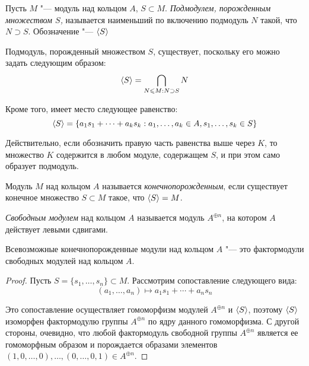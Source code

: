 \begin{definition}
	Пусть $M$ "--- модуль над кольцом $A$, $S \subset M$. \textit{Подмодулем, порожденным множеством $S$,} называется наименьший по включению подмодуль $N$ такой, что $N \supset S$. Обозначение "--- $\langle S \rangle$
\end{definition}

\begin{note}
	Подмодуль, порожденный множеством $S$, существует, поскольку его можно задать следующим образом:
	\[\langle S \rangle = \bigcap_{N \leqslant M : N \supset S}N\]
	
	Кроме того, имеет место следующее равенство:
	\[\langle S \rangle = \{a_1s_1 + \dotsb + a_ks_k : a_1, \dotsc, a_k \in A, s_1, \dotsc, s_k \in S\}\]
	
	Действительно, если обозначить правую часть равенства выше через $K$, то множество $K$ содержится в любом модуле, содержащем $S$, и при этом само образует подмодуль.
\end{note}

\begin{definition}
	Модуль $M$ над кольцом $A$ называется \textit{конечнопорожденным}, если существует конечное множество $S \subset M$ такое, что $\langle S \rangle = M$.
\end{definition}

\begin{definition}
	\textit{Свободным модулем} над кольцом $A$ называется модуль $A^{\oplus n}$, на котором $A$ действует левыми сдвигами.
\end{definition}

\begin{proposition}
	Всевозможные конечнопорожденные модули над кольцом $A$ "--- это фактормодули свободных модулей над кольцом $A$.
\end{proposition}

\begin{proof}
	Пусть $S = \{s_1, \dotsc, s_n\} \subset M$. Рассмотрим сопоставление следующего вида:
	\[(a_1, \dotsc, a_n) \mapsto a_1s_1 + \dotsb + a_ns_n\]
	
	Это сопоставление осуществляет гомоморфизм модулей $A^{\oplus n}$ и $\langle S \rangle$, поэтому $\langle S \rangle$ изоморфен фактормодулю группы $A^{\oplus n}$ по ядру данного гомоморфизма. С другой стороны, очевидно, что любой фактормодуль свободной группы $A^{\oplus n}$ является ее гомоморфным образом и порождается образами элементов $(1, 0, \dotsc, 0), \dotsc, (0, \dotsc, 0, 1) \in A^{\oplus n}$.
\end{proof}